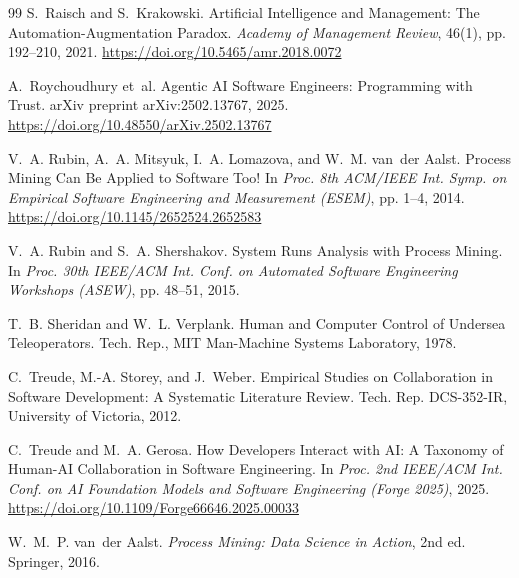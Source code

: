 \documentclass[sigconf]{acmart}
\begin{document}
\begin{thebibliography}{99}
S.~Raisch and S.~Krakowski.
\newblock Artificial Intelligence and Management: The Automation-Augmentation Paradox.
\newblock \emph{Academy of Management Review}, 46(1), pp. 192--210, 2021. \url{https://doi.org/10.5465/amr.2018.0072}

A.~Roychoudhury et~al.
\newblock Agentic AI Software Engineers: Programming with Trust.
\newblock arXiv preprint arXiv:2502.13767, 2025. \url{https://doi.org/10.48550/arXiv.2502.13767}

V.~A. Rubin, A.~A. Mitsyuk, I.~A. Lomazova, and W.~M. van~der Aalst.
\newblock Process Mining Can Be Applied to Software Too!
\newblock In \emph{Proc. 8th ACM/IEEE Int. Symp. on Empirical Software Engineering and Measurement (ESEM)}, pp. 1--4, 2014. \url{https://doi.org/10.1145/2652524.2652583}

V.~A. Rubin and S.~A. Shershakov.
\newblock System Runs Analysis with Process Mining.
\newblock In \emph{Proc. 30th IEEE/ACM Int. Conf. on Automated Software Engineering Workshops (ASEW)}, pp. 48--51, 2015.

T.~B. Sheridan and W.~L. Verplank.
\newblock Human and Computer Control of Undersea Teleoperators.
\newblock Tech. Rep., MIT Man-Machine Systems Laboratory, 1978.

C.~Treude, M.-A. Storey, and J.~Weber.
\newblock Empirical Studies on Collaboration in Software Development: A Systematic Literature Review.
\newblock Tech. Rep. DCS-352-IR, University of Victoria, 2012.

C.~Treude and M.~A. Gerosa.
\newblock How Developers Interact with AI: A Taxonomy of Human-AI Collaboration in Software Engineering.
\newblock In \emph{Proc. 2nd IEEE/ACM Int. Conf. on AI Foundation Models and Software Engineering (Forge 2025)}, 2025. \url{https://doi.org/10.1109/Forge66646.2025.00033}

W.~M.~P. van~der Aalst.
\newblock \emph{Process Mining: Data Science in Action}, 2nd ed.
\newblock Springer, 2016.

\end{thebibliography}
\end{document}
